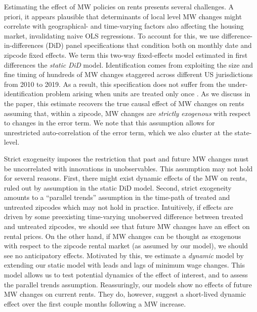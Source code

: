 Estimating the effect of MW policies on rents presents several challenges. A priori, 
it appears plausible that determinants of local level MW changes might correlate with 
geographical- and time-varying factors also affecting the housing market, invalidating naive OLS 
regressions. To account for this, we use difference-in-differences (DiD) panel specifications 
that condition both on monthly date and zipcode fixed effects. We term this two-way 
fixed-effects model estimated in first differences the \textit{static DiD} model. Identification 
comes from exploiting the size and fine timing of hundreds of MW changes staggered across 
different US jurisdictions from 2010 to 2019. As a result, this specification does not 
suffer from the under-identification problem arising when units are treated only once 
\parencite{BorusyakJaravel2017}. As we discuss in the paper, this estimate recovers the true 
causal effect of MW changes on rents assuming that, within a zipcode, MW changes are 
\textit{strictly exogenous} with respect to changes in the error term. We note that 
this assumption allows for unrestricted auto-correlation of the error term, which we also 
cluster at the state-level.

Strict exogeneity imposes the restriction that past and future MW changes must be uncorrelated 
with innovations in unobservables. This assumption may not hold for several reasons. First, there 
might exist dynamic effects of the MW on rents, ruled out by assumption in the static DiD 
model. Second, strict exogeneity amounts to a ``parallel trends'' assumption in the time-path of 
treated and untreated zipcodes which may not hold in practice. Intuitively, if effects are 
driven by some preexisting time-varying unobserved difference between treated and untreated 
zipcodes, we should see that future MW changes have an effect on rental prices. On the other 
hand, if MW changes can be thought as exogenous with respect to the zipcode rental market (as 
assumed by our model), we should see no anticipatory effects. Motivated by this, we estimate a 
\textit{dynamic} model by extending our static model with leads and lags of minimum wage 
changes. This model allows us to test potential dynamics of the effect of interest, and to 
assess the parallel trends assumption. Reassuringly, our models show no effects of future MW 
changes on current rents. They do, however, suggest a short-lived dynamic effect over the first 
couple months following a MW increase.

